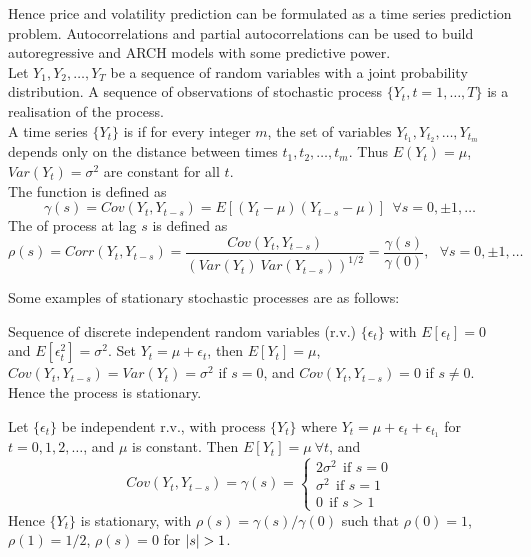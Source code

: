 Hence price and volatility prediction can be formulated as a time series prediction problem. Autocorrelations and partial autocorrelations can be used to build autoregressive and ARCH models with some predictive power.\\

Let $Y_1, Y_2, \ldots, Y_T$ be a sequence of random variables with a joint probability distribution. A sequence of observations of stochastic process $\{Y_t, t = 1, \ldots, T\}$ is a realisation of the process.\\
A time series $\{Y_t\}$ is  if for every integer $m$, the set of variables $Y_{t_1}, Y_{t_2}, \ldots, Y_{t_m}$ depends only on the distance between times $t_1, t_2, \ldots, t_m$. Thus $E(Y_t) = \mu$, $Var(Y_t) = \sigma^2$ are constant for all $t$.\\
The  function is defined as
\begin{equation}
\gamma(s) = Cov(Y_t, Y_{t-s}) = E[(Y_t - \mu)(Y_{t-s} - \mu)] \ \ \forall s = 0, \pm 1, \ldots \nonumber
\end{equation}
The  of process at lag $s$ is defined as
\begin{equation}
\rho(s) = Corr(Y_t, Y_{t-s}) = \frac{Cov(Y_t, Y_{t-s})}{\left(Var(Y_t) \ Var(Y_{t-s}) \right)^{1/2}} = \frac{\gamma(s)}{\gamma(0)}, \ \ \ \forall s = 0, \pm 1, \ldots \nonumber
\end{equation}

Some examples of stationary stochastic processes are as follows:

\begin{example}  Sequence of discrete independent random variables (r.v.) $\{\epsilon_t \}$ with $E[\epsilon_t] = 0$ and $E[\epsilon_t^2] = \sigma^2$. Set $Y_t = \mu + \epsilon_t$, then $E[Y_t] = \mu$, $Cov(Y_t, Y_{t-s}) = Var(Y_t) = \sigma^2$ if $s=0$, and $Cov(Y_t, Y_{t-s}) = 0$ if $s \neq 0$. Hence the process is stationary.
\end{example}

\begin{example}  Let $\{\epsilon_t\}$ be independent r.v., with process $\{Y_t\}$ where $Y_t = \mu + \epsilon_t + \epsilon_{t_1}$ for $t = 0, 1, 2, \ldots$, and $\mu$ is constant. Then $E[Y_t] = \mu \ \forall t$, and
\begin{equation}
Cov(Y_t, Y_{t-s}) = \gamma(s) = 
\begin{cases}
2 \sigma^2 \ \ \text{if } s = 0 \\
\sigma^2 \ \ \text{if } s = 1 \\
0 \ \ \text{if } s > 1
\end{cases} \nonumber
\end{equation}
Hence $\{Y_t\}$ is stationary, with $\rho(s) = \gamma(s) / \gamma(0)$ such that $\rho(0) = 1$, $\rho(1) = 1/2$, $\rho(s) = 0$ for $\left\lvert s\right\rvert > 1$.
\end{example}

